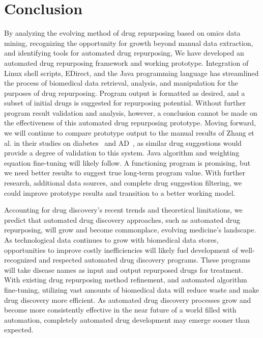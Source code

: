 \documentclass{IEEEtran}
\begin{document}
	\section{Conclusion}
	By analyzing the evolving method of drug repurposing based on omics data mining, recognizing the opportunity for growth beyond manual data extraction, and identifying tools for automated drug repurposing, We have developed an automated drug repurposing framework and working prototype.  Integration of Linux shell scripts, EDirect, and the Java programming language has streamlined the process of biomedical data retrieval, analysis, and manipulation for the purposes of drug repurposing.  Program output is formatted as desired, and a subset of initial drugs is suggested for repurposing potential.  Without further program result validation and analysis, however, a conclusion cannot be made on the effectiveness of this automated drug repurposing prototype.  Moving forward, we will continue to compare prototype output to the manual results of Zhang et al. in their studies on diabetes~\cite{zhang15} and AD~\cite{zhang16}, as similar drug suggestions would provide a degree of validation to this system.  Java algorithm and weighting equation fine-tuning will likely follow. A functioning program is promising, but we need better results to suggest true long-term program value.  With further research, additional data sources, and complete drug suggestion filtering, we could improve prototype results and transition to a better working model.
	
	Accounting for drug discovery's recent trends and theoretical limitations, we predict that automated drug discovery approaches, such as automated drug repurposing, will grow and become commonplace, evolving medicine's landscape.  As technological data continues to grow with biomedical data stores, opportunities to improve costly inefficiencies will likely fuel development of well-recognized and respected automated drug discovery programs. These programs will take disease names as input and output repurposed drugs for treatment.  With existing drug repurposing method refinement, and automated algorithm fine-tuning, utilizing vast amounts of biomedical data will reduce waste and make drug discovery more efficient. As automated drug discovery processes grow and become more consistently effective in the near future of a world filled with automation, completely automated drug development may emerge sooner than expected.  

\end{document}
